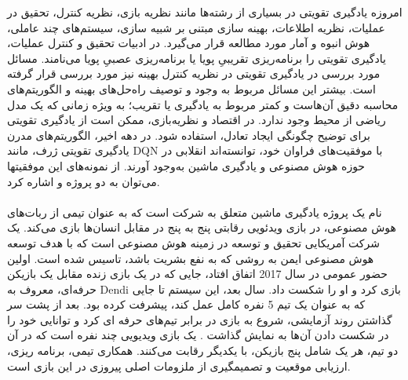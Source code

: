 امروزه یادگیری تقویتی
در بسیاری از رشته‌ها مانند نظریه بازی، نظریه کنترل، تحقیق در عملیات، نظریه اطلاعات، بهینه سازی مبتنی بر شبیه سازی، سیستم‌های چند عاملی، هوش انبوه و آمار مورد مطالعه قرار می‌گیرد. در ادبیات تحقیق و کنترل عملیات، یادگیری تقویتی را برنامه‌ریزی تقریبیِ پویا   یا برنامه‌ریزی عصبیِ پویا   می‌نامند. مسائل مورد بررسی در یادگیری تقویتی در نظریه کنترل بهینه  نیز مورد بررسی قرار گرفته است. بیشتر این مسائل مربوط به وجود و توصیف راه‌حل‌های بهینه و الگوریتم‌های محاسبه دقیق آن‌هاست و کمتر مربوط به یادگیری یا تقریب؛ به ویژه زمانی که یک مدل ریاضی از محیط وجود ندارد. در اقتصاد و نظریه‌بازی، ممکن است از یادگیری تقویتی برای توضیح چگونگی ایجاد تعادل، استفاده شود. در دهه اخیر، الگوریتم‌های مدرن یادگیری تقویتی ژرف، مانند DQN با موفقیت‌های فراوان خود، توانسته‌اند انقلابی در حوزه هوش مصنوعی و یادگیری ماشین به‌وجود آورند. از نمونه‌های این موفقیت\nf ها می‌توان به دو پروژه
 و
   اشاره کرد.
  
  \paragraph{}
    
   نام یک پروژه یادگیری ماشین متعلق به شرکت 
   است که به عنوان تیمی از ربات‌های هوش مصنوعی،  در بازی ویدئویی رقابتی پنج به پنج 
     در مقابل انسان‌ها بازی می‌کند.
 یک شرکت آمریکایی تحقیق و توسعه در زمینه هوش مصنوعی است که با هدف توسعه هوش مصنوعی ایمن به روشی که به نفع بشریت باشد، تاسیس شده است. اولین حضور عمومی
  در سال 2017 اتفاق افتاد، جایی که در یک بازی زنده مقابل یک بازیکن حرفه‌ای، معروف به Dendi بازی کرد و او را شکست داد. سال بعد، این سیستم تا جایی که به عنوان یک تیم 5 نفره کامل عمل کند، پیشرفت کرده بود. 
  بعد از پشت سر گذاشتن روند آزمایشی، شروع به بازی در برابر تیم‌های حرفه ای کرد و توانایی خود را در شکست دادن آن‌ها به نمایش گذاشت
  \cite{openai}. 
  یک بازی ویدیویی چند نفره است که در آن دو تیم، هر یک شامل پنج بازیکن، با یکدیگر رقابت می‌کنند. همکاری تیمی، برنامه ریزی، ارزیابی موقعیت و تصمیم\nf گیری از ملزومات اصلی پیروزی در این بازی است.
   
   
   

%
  

